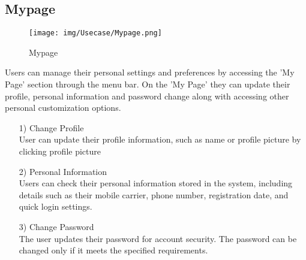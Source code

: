 \documentclass[conference]{IEEEtran}
\begin{document}
\clearpage 

\subsection{Mypage}
\begin{figure}[h]
\hspace{1.5cm}
\centering
\begin{minipage}{0.4\columnwidth}
    \texttt{[image: img/Usecase/Mypage.png]}
    \caption{Mypage}
\end{minipage}
\end{figure}
Users can manage their personal settings and preferences by accessing the 'My Page' section through the menu bar. On the 'My Page' they can update their profile, personal information and password change along with accessing other personal customization options. \\ 
\begin{enumerate}
    \item [1)] Change Profile \\
    User can update their profile information, such as name or profile picture by clicking profile picture \\
\end{enumerate}
\begin{enumerate}
    \item [2)] Personal Information \\
    Users can check their personal information stored in the system, including details such as their mobile carrier, phone number, registration date, and quick login settings. \\
\end{enumerate}
\begin{enumerate} 
    \item [3)] Change Password \\
    The user updates their password for account security. The password can be changed only if it meets the specified requirements. \\ \\ \\ \\ \\ \\ \\ \\ \\ \\ \\ \\ \\ 
\end{enumerate}
\end{document}
